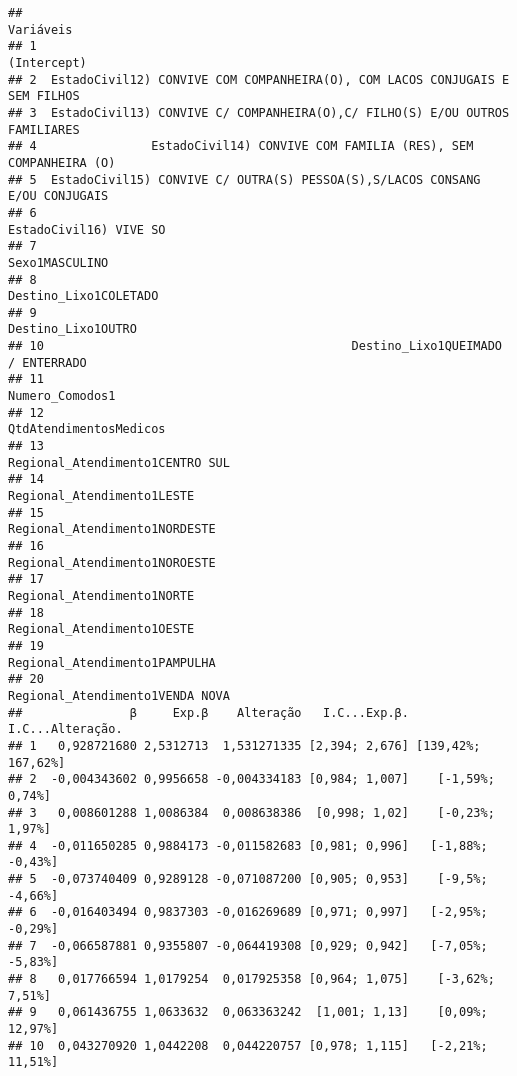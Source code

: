 \documentclass[
]{article}
\begin{document}
\begin{verbatim}
##                                                                      Variáveis
## 1                                                                  (Intercept)
## 2  EstadoCivil12) CONVIVE COM COMPANHEIRA(O), COM LACOS CONJUGAIS E SEM FILHOS
## 3  EstadoCivil13) CONVIVE C/ COMPANHEIRA(O),C/ FILHO(S) E/OU OUTROS FAMILIARES
## 4                EstadoCivil14) CONVIVE COM FAMILIA (RES), SEM COMPANHEIRA (O)
## 5  EstadoCivil15) CONVIVE C/ OUTRA(S) PESSOA(S),S/LACOS CONSANG E/OU CONJUGAIS
## 6                                                       EstadoCivil16) VIVE SO
## 7                                                               Sexo1MASCULINO
## 8                                                        Destino_Lixo1COLETADO
## 9                                                           Destino_Lixo1OUTRO
## 10                                           Destino_Lixo1QUEIMADO / ENTERRADO
## 11                                                             Numero_Comodos1
## 12                                                      QtdAtendimentosMedicos
## 13                                             Regional_Atendimento1CENTRO SUL
## 14                                                  Regional_Atendimento1LESTE
## 15                                               Regional_Atendimento1NORDESTE
## 16                                               Regional_Atendimento1NOROESTE
## 17                                                  Regional_Atendimento1NORTE
## 18                                                  Regional_Atendimento1OESTE
## 19                                               Regional_Atendimento1PAMPULHA
## 20                                             Regional_Atendimento1VENDA NOVA
##               β     Exp.β    Alteração   I.C...Exp.β.   I.C...Alteração.
## 1   0,928721680 2,5312713  1,531271335 [2,394; 2,676] [139,42%; 167,62%]
## 2  -0,004343602 0,9956658 -0,004334183 [0,984; 1,007]    [-1,59%; 0,74%]
## 3   0,008601288 1,0086384  0,008638386  [0,998; 1,02]    [-0,23%; 1,97%]
## 4  -0,011650285 0,9884173 -0,011582683 [0,981; 0,996]   [-1,88%; -0,43%]
## 5  -0,073740409 0,9289128 -0,071087200 [0,905; 0,953]    [-9,5%; -4,66%]
## 6  -0,016403494 0,9837303 -0,016269689 [0,971; 0,997]   [-2,95%; -0,29%]
## 7  -0,066587881 0,9355807 -0,064419308 [0,929; 0,942]   [-7,05%; -5,83%]
## 8   0,017766594 1,0179254  0,017925358 [0,964; 1,075]    [-3,62%; 7,51%]
## 9   0,061436755 1,0633632  0,063363242  [1,001; 1,13]    [0,09%; 12,97%]
## 10  0,043270920 1,0442208  0,044220757 [0,978; 1,115]   [-2,21%; 11,51%]

\end{verbatim}
\end{document}
